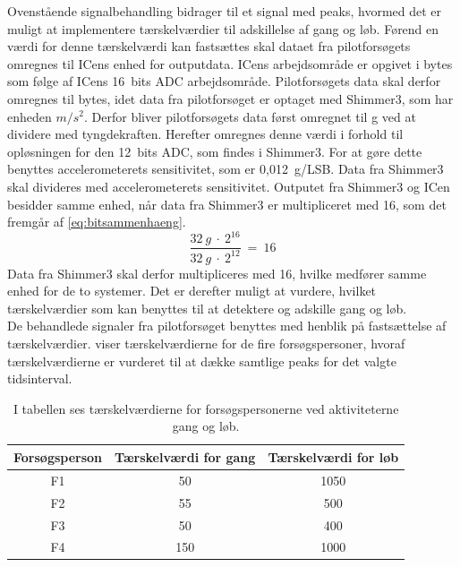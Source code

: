 Ovenstående signalbehandling bidrager til et signal med peaks, hvormed det er muligt at implementere tærskelværdier til adskillelse af gang og løb. Førend en værdi for denne tærskelværdi kan fastsættes skal dataet fra pilotforsøgets omregnes til ICens enhed for outputdata. ICens arbejdsområde er opgivet i bytes som følge af ICens 16~bits ADC arbejdsområde. Pilotforsøgets data skal derfor omregnes til bytes, idet data fra pilotforsøget er optaget med Shimmer3, som har enheden $m/s^{2}$. Derfor bliver pilotforsøgets data først omregnet til g ved at dividere med tyngdekraften. Herefter omregnes denne værdi i forhold til opløsningen for den 12~bits ADC, som findes i Shimmer3. For at gøre dette benyttes accelerometerets sensitivitet, som er 0,012~g/LSB. Data fra Shimmer3 skal divideres med accelerometerets sensitivitet. Outputet fra Shimmer3 og ICen besidder samme enhed, når data fra Shimmer3 er multipliceret med 16, som det fremgår af \eqref{eq:bitsammenhaeng}.
\begin{equation}
\frac{32~g~\cdot~2^{16}}{32~g~\cdot~2^{12}}~=~16
\label{eq:bitsammenhaeng}
\end{equation}
Data fra Shimmer3 skal derfor multipliceres med 16, hvilke medfører samme enhed for de to systemer. Det er derefter muligt at vurdere, hvilket tærskelværdier som kan benyttes til at detektere og adskille gang og løb.\\
De behandlede signaler fra pilotforsøget benyttes med henblik på fastsættelse af tærskelværdier.  viser tærskelværdierne for de fire forsøgspersoner, hvoraf tærskelværdierne er vurderet til at dække samtlige peaks for det valgte tidsinterval. 
\begin{table}[H]
	\centering
	\begin{tabular}{ccc}
		\hline
		\rowcolor[HTML]{C0C0C0} 
		Forsøgsperson & Tærskelværdi for gang & Tærskelværdi for løb \\ \hline
		\rowcolor[HTML]{FFFFFF} 
		F1 & 50 & 1050 \\ \hline
		\rowcolor[HTML]{FFFFFF} 
		F2 & 55 & 500 \\ \hline
		\rowcolor[HTML]{FFFFFF} 
		F3 & 50 & 400 \\ \hline
		\rowcolor[HTML]{FFFFFF} 
		F4 & 150 & 1000 \\ \hline
	\end{tabular}
	\caption{I tabellen ses tærskelværdierne for forsøgspersonerne ved aktiviteterne gang og løb.}
	\label{tab:individuel_taerskel}
\end{table}\vspace{-0.25cm}
